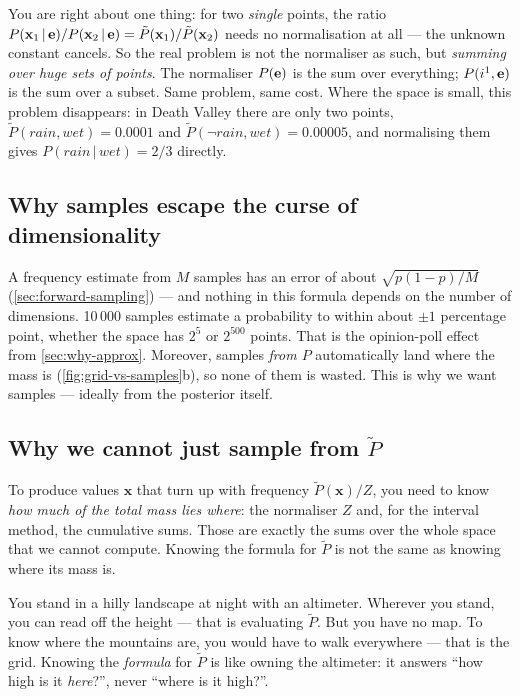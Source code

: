 \documentclass[11pt, oneside]{book}
\newcommand{\Prob}{\mathbb{P}}           %
\newcommand{\given}{\,\vert\,}           %
\newcommand{\bx}{\mathbf{x}}  \newcommand{\by}{\mathbf{y}}
\newcommand{\vn}[1]{\mathit{#1}}         %
\let\originalsubsection\subsection
\renewcommand{\subsection}{\Needspace{6\baselineskip}\originalsubsection}
\begin{document}
You are right about one thing: for two \emph{single} points, the ratio
$P(\bx_1 \given \be) / P(\bx_2 \given \be) = \tilde P(\bx_1)/\tilde P(\bx_2)$
needs no normalisation at all --- the unknown constant cancels. So the real
problem is not the normaliser as such, but \emph{summing over huge sets of
points}. The normaliser $P(\mathbf{e})$ is the sum over everything; $P(i^1, \mathbf{e})$ is
the sum over a subset. Same problem, same cost. Where the space is small, this
problem disappears: in Death Valley there are only two points,
$\tilde P(\vn{rain}, \vn{wet}) = 0.0001$ and $\tilde P(\neg\vn{rain}, \vn{wet})
= 0.00005$, and normalising them gives $P(\vn{rain} \given \vn{wet}) = 2/3$
directly.

\subsection{Why samples escape the curse of dimensionality}

A frequency estimate from $M$ samples has an error of about
$\sqrt{p(1-p)/M}$ (\cref{sec:forward-sampling}) --- and nothing in this
formula depends on the number of dimensions. 10\,000 samples estimate a
probability to within about $\pm 1$ percentage point, whether the space has
$2^5$ or $2^{500}$ points. That is the opinion-poll effect from
\cref{sec:why-approx}. Moreover, samples \emph{from $P$} automatically land
where the mass is (\cref{fig:grid-vs-samples}b), so none of them is wasted.
This is why we want samples --- ideally from the posterior itself.

\subsection{Why we cannot just sample from \texorpdfstring{$\tilde P$}{P~}}

To produce values $\bx$ that turn up with frequency $\tilde P(\bx)/Z$, you need
to know \emph{how much of the total mass lies where}: the normaliser $Z$ and,
for the interval method, the cumulative sums. Those are exactly the sums over
the whole space that we cannot compute. Knowing the formula for $\tilde P$ is
not the same as knowing where its mass is.

\begin{intbox}[title={The altimeter in the dark}, unbreakable]
You stand in a hilly landscape at night with an altimeter. Wherever you stand,
you can read off the height --- that is evaluating $\tilde P$. But you have no
map. To know where the mountains are, you would have to walk everywhere ---
that is the grid. Knowing the \emph{formula} for $\tilde P$ is like owning the
altimeter: it answers ``how high is it \emph{here}?'', never ``where is it
high?''.
\end{intbox}
\end{document}
